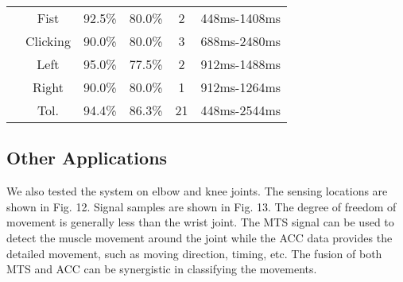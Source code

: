\begin{table}
\begin{tabular}{|c|c|c|c|c|c|}
\cline{2-6}
                                                                                         & Fist           & 92.5\%      & 80.0\%    & 2     & 448ms-1408ms   \\ 
\cline{2-6}
                                                                                         & Clicking       & 90.0\%      & 80.0\%    & 3     & 688ms-2480ms   \\ 
\cline{2-6}
                                                                                         & Left           & 95.0\%      & 77.5\%    & 2     & 912ms-1488ms   \\ 
\cline{2-6}
                                                                                         & Right          & 90.0\%      & 80.0\%    & 1     & 912ms-1264ms   \\ 
\cline{2-6}
                                                                                         & Tol.           & 94.4\%      & 86.3\%    & 21    & 448ms-2544ms   \\
\bottomrule
\end{tabular}
\end{table}

\subsection{Other Applications}
We also tested the system on elbow and knee joints. The
sensing locations are shown in Fig. 12. Signal samples are
shown in Fig. 13. The degree of freedom of movement is
generally less than the wrist joint. The MTS signal can be
used to detect the muscle movement around the joint while
the ACC data provides the detailed movement, such as moving
direction, timing, etc. The fusion of both MTS and ACC can
be synergistic in classifying the movements.